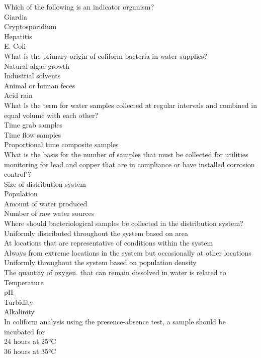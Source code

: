 Which of the following is an indicator organism?\\
Giardia\\
Cryptosporidium\\
Hepatitis\\
E. Coli\\
	What is the primary origin of coliform bacteria in water supplies?\\
	Natural algae growth\\
	Industrial solvents\\
	Animal or human feces\\
	Acid rain\\
	What ls the term for water samples collected at regular intervals and combined in equal volume with each other?\\
	Time grab samples\\
	Time flow samples\\
Proportional time composite samples\\
	What is the basis for the number of samples that must be collected for utilities monitoring for lead and copper that are in compliance or have installed corrosion control'?\\
	Size of distribution system\\
	Population\\
	Amount of water produced\\
	Number of raw water sources\\
	Where should bacteriological samples be collected in the distribution system?\\
	Uniformly distributed throughout the system based on area\\
	At locations that are representative of conditions within the system\\
	Always from extreme locations in the system but occasionally at other locations\\
	Uniformly throughout the system based on population density\\
	The	quantity of oxygen. that can remain dissolved in water is related to\\
	Temperature\\
	pH\\
	Turbidity\\
	Alkalinity\\
	In coliform analysis using the presence-absence test, a sample should be incubated for	\\
	24 hours at 25°C\\
	36 hours at 35°C\\
